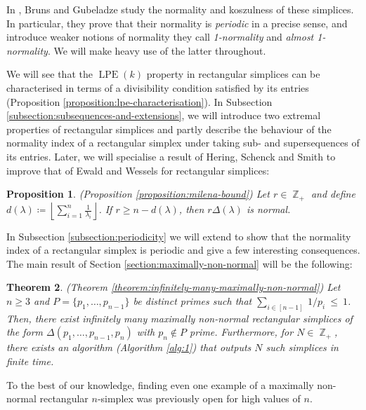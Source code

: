 \documentclass[a4paper,11pt]{amsart}
\theoremstyle{plain}
\newtheorem{theorem}{Theorem}[section]
\newtheorem{proposition}[theorem]{Proposition}
\theoremstyle{definition}
\theoremstyle{remark}
\DeclareMathOperator{\ZZ}{\mathbb{Z}}
\DeclareMathOperator{\LPE}{LPE}
\begin{document}
In \cite{BrunsGubeladze:1999}, Bruns and Gubeladze study the normality and koszulness of these simplices. In particular, they prove that their normality is \emph{periodic} in a precise sense, and introduce weaker notions of normality they call \emph{1-normality} and \emph{almost 1-normality}. We will make heavy use of the latter throughout.

We will see that the $\LPE(k)$ property in rectangular simplices can be characterised in terms of a divisibility condition satisfied by its entries (Proposition \ref{proposition:lpe-characterisation}). In Subsection \ref{subsection:subsequences-and-extensions}, we will introduce two extremal properties of rectangular simplices and partly describe the behaviour of the normality index of a rectangular simplex under taking sub- and supersequences of its entries. Later, we will specialise a result of Hering, Schenck and Smith \cite[Theorem 1.1, Corollary 1.4]{HerinSchenckSmith:2006} to improve that of Ewald and Wessels for rectangular simplices:

\begin{proposition}(Proposition \ref{proposition:milena-bound})
    Let $r \in \ZZ_+$ and define $d(\lambda) \coloneqq \left \lfloor \sum_{i = 1}^n \frac{1}{\lambda_i} \right \rfloor$. If $r \geq n - d(\lambda)$, then $r\Delta(\lambda)$ is normal.
\end{proposition}

In Subsection \ref{subsection:periodicity} we will extend \cite[Theorem 1.6]{BrunsGubeladze:1999} to show that the normality index of a rectangular simplex is periodic and give a few interesting consequences. The main result of Section \ref{section:maximally-non-normal} will be the following:

\begin{theorem}(Theorem \ref{theorem:infinitely-many-maximally-non-normal})
    Let $n \geq 3$ and $P = \{p_1, \ldots, p_{n - 1}\}$ be distinct primes such that $\sum_{i \in [n - 1]}~1/p_i~\leq~1$. Then, there exist infinitely many maximally non-normal rectangular simplices of the form $\Delta(p_1, \ldots, p_{n - 1}, p_n)$ with $p_n \notin P$ prime. Furthermore, for $N \in \ZZ_+$, there exists an algorithm (Algorithm \ref{alg:1}) that outputs $N$ such simplices in finite time.
\end{theorem}

To the best of our knowledge, finding even one example of a maximally non-normal rectangular $n$-simplex was previously open for high values of $n$.
\end{document}

